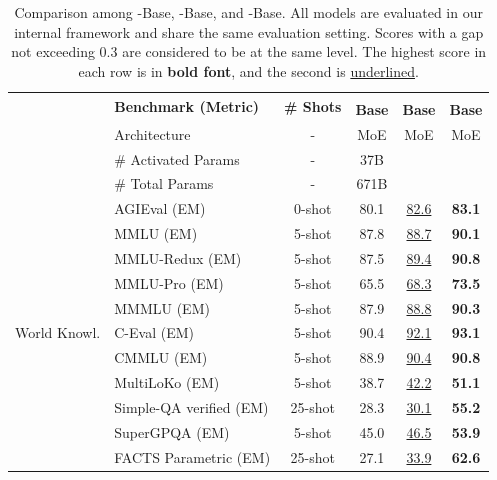 \begin{table}[!h]
    \centering
    \footnotesize
    \caption{
        Comparison among \dsviiiII{}-Base, \dsvivf{}-Base, and \dsvivp{}-Base.
        All models are evaluated in our internal framework and share the same evaluation setting.
        Scores with a gap not exceeding 0.3 are considered to be at the same level.
        The highest score in each row is in \textbf{bold font}, and the second is \underline{underlined}. 
    }
    \setlength{\tabcolsep}{4pt}
    \begin{tabular}{@{}c l c | c c c@{}}
    \toprule
    & \multirow{2}{*}{\centering \textbf{Benchmark {\tiny (Metric)}}} & \multirow{2}{*}{\textbf{\# Shots}} & \textbf{\dsviiiII{}} & \textbf{\dsvivf{}} & \textbf{\dsvivp{}} \\
    & & & \textbf{Base} & \textbf{Base} & \textbf{Base} \\
    \midrule
    & Architecture & - & MoE & MoE & MoE \\
    & \# Activated Params & - & 37B & \dsvivfap{} & \dsvivpap{} \\
    & \# Total Params & - & 671B & \dsvivftp{} & \dsvivptp{} \\
    \midrule
    \multirow{12}{*}{World Knowl.}
    & AGIEval {\tiny (EM)} & 0-shot & 80.1  & \underline{82.6} & \textbf{83.1} \\
    & MMLU {\tiny (EM)} & 5-shot & 87.8 & \underline{88.7} & \textbf{90.1} \\
    & MMLU-Redux {\tiny (EM)} & 5-shot & 87.5 & \underline{89.4} & \textbf{90.8} \\
    & MMLU-Pro {\tiny (EM)} & 5-shot & 65.5 & \underline{68.3} & \textbf{73.5} \\
    & MMMLU {\tiny (EM)} & 5-shot & 87.9 & \underline{88.8} & \textbf{90.3} \\
    & C-Eval {\tiny (EM)} & 5-shot & 90.4 & \underline{92.1} & \textbf{93.1} \\
    & CMMLU {\tiny (EM)} & 5-shot & 88.9 & \underline{90.4} & \textbf{90.8} \\
    & MultiLoKo {\tiny (EM)} & 5-shot & 38.7 & \underline{42.2} & \textbf{51.1} \\
    & Simple-QA verified {\tiny (EM)} & 25-shot & 28.3 & \underline{30.1} & \textbf{55.2} \\
    & SuperGPQA {\tiny (EM)} & 5-shot & 45.0 & \underline{46.5} & \textbf{53.9} \\
    & FACTS Parametric {\tiny (EM)} & 25-shot & 27.1 & \underline{33.9} & \textbf{62.6} \\

\end{tabular}
\end{table}
